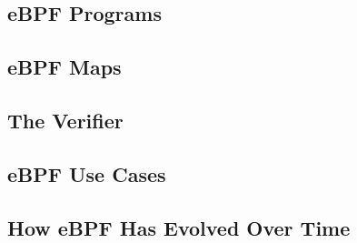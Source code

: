 \subsection{eBPF Programs}%
\label{ss:bpf-programs-bg}

\subsection{eBPF Maps}%
\label{ss:bpf-maps-bg}

\subsection{The Verifier}%
\label{ss:verifier-bg}

\subsection{eBPF Use Cases}%
\label{ss:ebpf-use-cases-bg}

\subsection{How eBPF Has Evolved Over Time}%
\label{ss:ebpf-evolution-bg}

